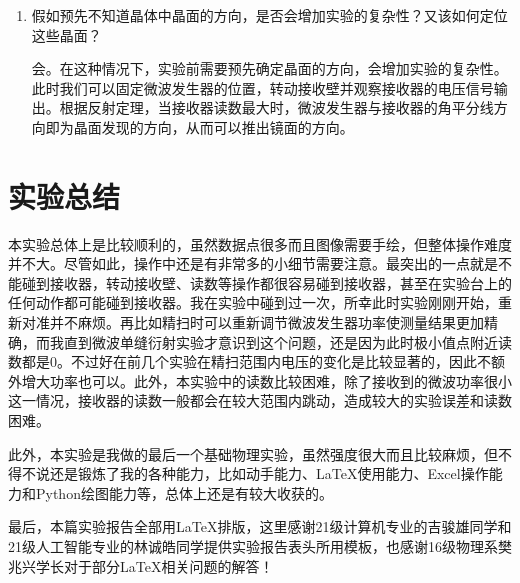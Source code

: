 \documentclass[12pt]{article}
\begin{document}
\begin{enumerate}
    \item {\kaishu 假如预先不知道晶体中晶面的方向，是否会增加实验的复杂性？又该如何定位这些晶面？}
    
    会。在这种情况下，实验前需要预先确定晶面的方向，会增加实验的复杂性。此时我们可以固定微波发生器的位置，转动接收壁并观察接收器的电压信号输出。根据反射定理，当接收器读数最大时，微波发生器与接收器的角平分线方向即为晶面发现的方向，从而可以推出镜面的方向。

\end{enumerate}

\section{实验总结}

本实验总体上是比较顺利的，虽然数据点很多而且图像需要手绘，但整体操作难度并不大。尽管如此，操作中还是有非常多的小细节需要注意。最突出的一点就是不能碰到接收器，转动接收壁、读数等操作都很容易碰到接收器，甚至在实验台上的任何动作都可能碰到接收器。我在实验中碰到过一次，所幸此时实验刚刚开始，重新对准并不麻烦。再比如精扫时可以重新调节微波发生器功率使测量结果更加精确，而我直到微波单缝衍射实验才意识到这个问题，还是因为此时极小值点附近读数都是0。不过好在前几个实验在精扫范围内电压的变化是比较显著的，因此不额外增大功率也可以。此外，本实验中的读数比较困难，除了接收到的微波功率很小这一情况，接收器的读数一般都会在较大范围内跳动，造成较大的实验误差和读数困难。

此外，本实验是我做的最后一个基础物理实验，虽然强度很大而且比较麻烦，但不得不说还是锻炼了我的各种能力，比如动手能力、\LaTeX{}使用能力、Excel操作能力和Python绘图能力等，总体上还是有较大收获的。

最后，本篇实验报告全部用\LaTeX{}排版，这里感谢21级计算机专业的吉骏雄同学和21级人工智能专业的林诚皓同学提供实验报告表头所用模板，也感谢16级物理系樊兆兴学长对于部分\LaTeX{}相关问题的解答！
\end{document}
